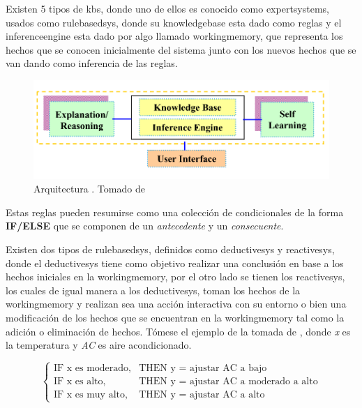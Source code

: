 Existen 5 tipos de \gls{kbs}, donde uno de ellos es conocido como \gls{expertsystems}, usados como \gls{rulebasedsys}, donde su \gls{knowledgebase} esta dado como reglas y el \gls{inferenceengine} esta dado por algo llamado \gls{workingmemory}, que representa los hechos que se conocen inicialmente del sistema junto con los nuevos hechos que se van dando como inferencia de las reglas.

\begin{figure}[H]
\centering
\includegraphics[scale=0.4]{Figures/kbs-architecture.png}
\decoRule
\caption[Arquitectura ]{Arquitectura . Tomado de \cite{sajja2010knowledge} }
\label{fig:kbs-arch}
\end{figure}

Estas reglas pueden resumirse como una colección de condicionales de la forma \textbf{IF/ELSE} que se componen de un \emph{antecedente} y un \emph{consecuente}.

Existen dos tipos de \gls{rulebasedsys}, definidos como \gls{deductivesys} y \gls{reactivesys}, donde el \gls{deductivesys} tiene como objetivo realizar una conclusión en base a los hechos iniciales en la \gls{workingmemory}, por el otro lado se tienen los \gls{reactivesys}, los cuales de igual manera a los \gls{deductivesys}, toman los hechos de la \gls{workingmemory} y realizan sea una acción interactiva con su entorno o bien una modificación de los hechos que se encuentran en la \gls{workingmemory} tal como la adición o eliminación de hechos. Tómese el ejemplo de la  tomada de \cite{Mendel}, donde \emph{x} es la temperatura y \emph{AC} es aire acondicionado.

\begin{equation} \label{eq:rbs-example}
  \left\{ \begin{array}{ll}
            \text{IF x es moderado,} & \text{THEN y = ajustar AC a bajo} \\
            \text{IF x es alto,}     & \text{THEN y = ajustar AC a moderado a alto} \\
            \text{IF x es muy alto,} & \text{THEN y = ajustar AC a alto} 
          \end{array} \right.
\end{equation}

